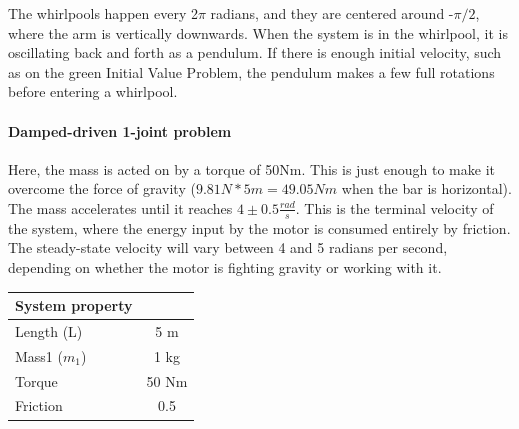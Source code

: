 \documentclass{article}
\begin{document}
\centering The whirlpools happen every 2$\pi$ radians, and they are centered around -$\pi/2$, where the arm is vertically downwards. When the system is in the whirlpool, it is oscillating back and forth as a pendulum. If there is enough initial velocity, such as on the green Initial Value Problem, the pendulum makes a few full rotations before entering a whirlpool.

\begin{center}
%
\label{labelname}%
\end{center}

\newpage

\paragraph{Damped-driven 1-joint problem}
Here, the mass is acted on by a torque of 50Nm. This is just enough to make it overcome the force of gravity ($9.81N * 5m = 49.05Nm$ when the bar is horizontal). The mass accelerates until it reaches $4\pm0.5\frac{rad}{s}$. This is the terminal velocity of the system, where the energy input by the motor is consumed entirely by friction. The steady-state velocity will vary between 4 and 5 radians per second, depending on whether the motor is fighting gravity or working with it. 

\begin{table}[h]
\centering
\begin{tabular}{|l|c|}
\hline
System property & \\
\hline
Length (L) & 5 m \\
Mass1 ($m_1$) & 1 kg \\
Torque & 50 Nm \\
Friction & 0.5 \\ %
\hline
\end{tabular}
\label{tab:quantities}
\end{table}
\end{document}
